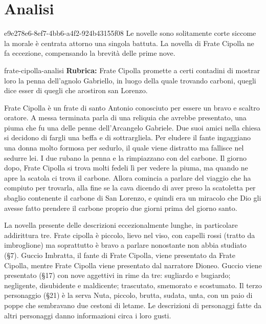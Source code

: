 \documentclass[preview]{standalone}
\begin{document}
\genpage

\section{Analisi}

\begin{snippetnote}{e9e278e6-8ef7-4bb6-a4f2-924b43155f08}{}
    Le novelle sono solitamente corte siccome la morale è centrata attorno una singola battuta.
    La novella di Frate Cipolla ne fa eccezione, compensando la brevità delle prime nove.
\end{snippetnote}

\begin{snippet}{frate-cipolla-analisi}
    \textbf{Rubrica:} Frate Cipolla promette a certi contadini di mostrar loro la penna dell'agnolo Gabriello, in luogo della quale trovando carboni, quegli dice esser di quegli che arostiron san Lorenzo.

    Frate Cipolla è un frate di santo Antonio conosciuto per essere un bravo e scaltro oratore.
    A messa terminata parla di una reliquia che avrebbe presentato, una piuma che fu una delle penne dell'Arcangelo Gabriele.
    Due suoi amici nella chiesa si decidono di fargli una beffa e di sottrargliela.
    Per eludere il fante ingaggiano una donna molto formosa per sedurlo, il quale viene distratto ma fallisce nel sedurre lei.
    I due rubano la penna e la rimpiazzano con del carbone.
    Il giorno dopo, Frate Cipolla si trova molti fedeli lì per vedere la piuma, ma quando ne apre la scatola
    ci trova il carbone. Allora comincia a parlare del viaggio che ha compiuto per trovarla,
    alla fine se la cava dicendo di aver preso la scatoletta per sbaglio contenente il carbone di San Lorenzo,
    e quindi era un miracolo che Dio gli avesse fatto prendere il carbone proprio due giorni prima del giorno santo.
    
    
    La novella presente delle descrizioni eccezionalmente lunghe, in particolare addirittura tre.
    Frate cipolla è piccolo, lievo nel viso, con capelli rossi (tratto da imbroglione) ma
    soprattutto è bravo a parlare nonostante non abbia studiato (§7).
    Guccio Imbratta, il fante di Frate Cipolla, viene presentato da Frate Cipolla,
    mentre Frate Cipolla viene presentato dal narratore Dioneo.
    Guccio viene presentato (§17) con nove aggettivi in rime da tre:
    sugliardo e bugiardo; negligente, disubidente e maldicente; trascutato, smemorato e scostumato.
    Il terzo personaggio (§21) è la serva Nuta, piccolo, brutta, sudata, unta, con un paio di poppe che sembravano due
    cestoni di letame.
    Le descrizioni di personaggi fatte da altri personaggi danno informazioni circa i loro gusti.
    

\end{snippet}
\end{document}
